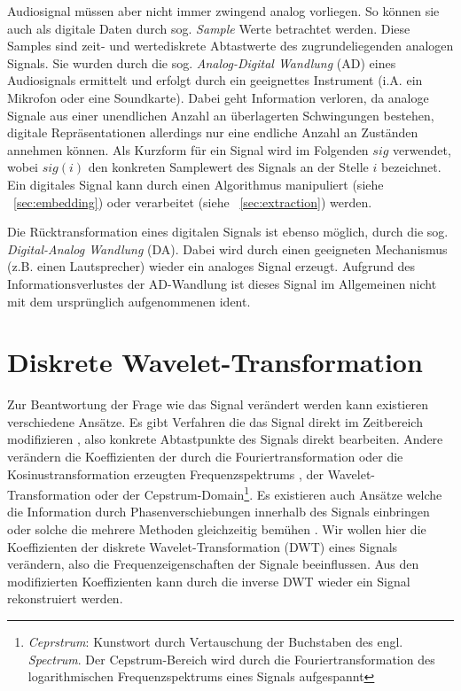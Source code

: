 Audiosignal müssen aber nicht immer zwingend analog vorliegen. So können sie auch als digitale Daten durch sog. \textit{Sample} Werte betrachtet werden. Diese Samples sind zeit- und wertediskrete Abtastwerte des zugrundeliegenden analogen Signals. Sie wurden durch die sog. \textit{Analog-Digital Wandlung} (AD) eines Audiosignals ermittelt und erfolgt durch ein geeignettes Instrument (i.A. ein Mikrofon oder eine Soundkarte). Dabei geht Information verloren, da analoge Signale aus einer unendlichen Anzahl an \"uberlagerten Schwingungen bestehen, digitale Repr\"asentationen allerdings nur eine endliche Anzahl an Zust\"anden annehmen k\"onnen. Als Kurzform für ein Signal wird im Folgenden $sig$ verwendet, wobei $sig(i)$ den konkreten Samplewert des Signals an der Stelle $i$ bezeichnet. Ein digitales Signal kann durch einen Algorithmus manipuliert (siehe ~\ref{sec:embedding}) oder verarbeitet (siehe ~\ref{sec:extraction}) werden.

Die Rücktransformation eines digitalen Signals ist ebenso möglich, durch die sog. \textit{Digital-Analog Wandlung} (DA). Dabei wird durch einen geeigneten Mechanismus (z.B. einen Lautsprecher) wieder ein analoges Signal erzeugt. Aufgrund des Informationsverlustes der AD-Wandlung ist dieses Signal im Allgemeinen nicht mit dem urspr\"unglich aufgenommenen ident. 


\section{Diskrete Wavelet-Transformation} 
 
	
Zur Beantwortung der Frage wie das Signal ver\"andert werden kann existieren verschiedene Ans\"atze. Es gibt Verfahren die das Signal direkt im Zeitbereich modifizieren \cite{bassia2001robust}\cite{lie2006robust}, also konkrete Abtastpunkte des Signals direkt bearbeiten. Andere ver\"andern die Koeffizienten der durch die Fouriertransformation oder die Kosinustransformation erzeugten Frequenzspektrums \cite{chang2012location}, der Wavelet-Transformation\cite{tang2005digital} oder der Cepstrum-Domain\footnote{\textit{Ceprstrum}: Kunstwort durch Vertauschung der Buchstaben des engl. \textit{Spectrum}. Der Cepstrum-Bereich wird durch die Fouriertransformation des logarithmischen Frequenzspektrums eines Signals aufgespannt}\cite{lee2000digital}\cite{li2000transparent}. Es existieren auch Ans\"atze welche die Information durch Phasenverschiebungen innerhalb des Signals einbringen \cite{dong2004data}\cite{ansari2004data} oder solche die mehrere Methoden gleichzeitig bem\"uhen \cite{lei2012multipurpose}. Wir wollen hier die Koeffizienten der diskrete Wavelet-Transformation (DWT) eines Signals ver\"andern, also die Frequenzeigenschaften der Signale beeinflussen. Aus den modifizierten Koeffizienten kann durch die inverse DWT wieder ein Signal rekonstruiert werden. 
	
